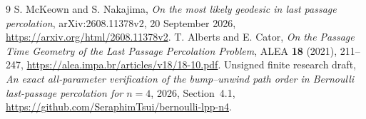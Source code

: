 \documentclass[11pt,a4paper]{article}
\begin{document}
\begin{thebibliography}{9}
 S. McKeown and S. Nakajima,
\emph{On the most likely geodesic in last passage percolation},
arXiv:2608.11378v2, 20 September 2026,
\url{https://arxiv.org/html/2608.11378v2}.
 T. Alberts and E. Cator,
\emph{On the Passage Time Geometry of the Last Passage Percolation Problem},
ALEA \textbf{18} (2021), 211--247,
\url{https://alea.impa.br/articles/v18/18-10.pdf}.
 Unsigned finite research draft,
\emph{An exact all-parameter verification of the bump--unwind path order
in Bernoulli last-passage percolation for $n=4$},
2026, Section~4.1,
\url{https://github.com/SeraphimTsui/bernoulli-lpp-n4}.
\end{thebibliography}
\end{document}
